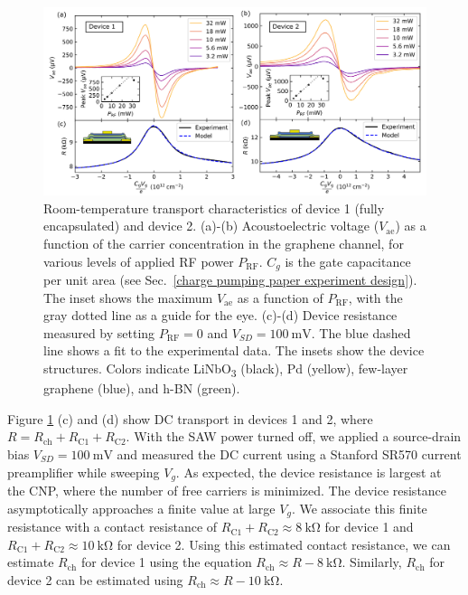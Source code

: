 \documentclass[double,12pt,1in,seploa]{beavtex}
\begin{document}
\begin{figure}
    \includegraphics[width = 1\textwidth]{Figure 2, both devices AE and DC transport data.png}
    \caption{Room-temperature transport characteristics of device 1 (fully encapsulated) and device 2. (a)-(b) Acoustoelectric voltage ($V_{\mathrm{ae}}$) as a function of the carrier concentration in the graphene channel, for various levels of applied RF power $P_{\mathrm{RF}}$. $C_g$ is the gate capacitance per unit area (see Sec.\ \ref{charge pumping paper experiment design}). The inset shows the maximum $V_{\mathrm{ae}}$ as a function of $P_{\mathrm{RF}}$, with the gray dotted line as a guide for the eye. (c)-(d) Device resistance measured by setting $P_{\mathrm{RF}} = 0$ and $V_{SD} = \SI{100}{\milli\volt}$. The blue dashed line shows a fit to the experimental data. The insets show the device structures. Colors indicate LiNbO\textsubscript{3} (black), Pd (yellow), few-layer graphene (blue), and h-BN (green).}
    \label{AECP Figure 2}
\end{figure}

Figure \ref{AECP Figure 2} (c) and (d) show DC transport in devices 1 and 2, where $R = R_{\mathrm{ch}} + R_{\mathrm{C1}} + R_{\mathrm{C2}}$. With the SAW power turned off, we applied a source-drain bias $V_{SD} = \SI{100}{\milli\volt}$ and measured the DC current using a Stanford SR570 current preamplifier while sweeping $V_g$. As expected, the device resistance is largest at the CNP, where the number of free carriers is minimized. The device resistance asymptotically approaches a finite value at large $V_g$. We associate this finite resistance with a contact resistance of $R_{\mathrm{C1}} + R_{\mathrm{C2}} \approx \SI{8}{\kilo\ohm}$ for device 1 and $R_{\mathrm{C1}} + R_{\mathrm{C2}} \approx \SI{10}{\kilo\ohm}$ for device 2. Using this estimated contact resistance, we can estimate $R_{\mathrm{ch}}$ for device 1 using the equation $R_{\mathrm{ch}} \approx R - \SI{8}{\kilo\ohm}$. Similarly, $R_{\mathrm{ch}}$ for device 2 can be estimated using $R_{\mathrm{ch}} \approx R - \SI{10}{\kilo\ohm}$.
\end{document}

